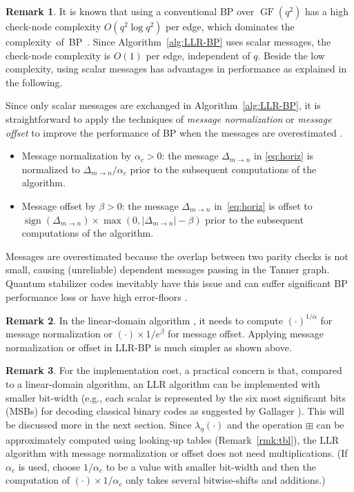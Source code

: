 \documentclass{ieeeaccess}
\DeclareMathOperator{\sign}{sign}
\DeclareMathOperator{\GF}{GF}
\let\emph\textit
\theoremstyle{definition}		%
\newtheorem{remark}{Remark}
\begin{document}
\begin{remark} \label{rmk:cmpx_c}
	It is known that using a conventional BP over $\GF(q^2)$ has a high check-node complexity $O(q^2\log q^2)$ per edge, which 
	dominates the \mbox{complexity of BP \cite{MD01,DF07,Bab+15}}. 
	Since Algorithm~\ref{alg:LLR-BP} uses scalar messages, the check-node complexity is $O(1)$ per edge, independent of $q$.
	Beside the low complexity, using scalar messages has advantages in performance as explained in the following.
\end{remark}


Since only scalar messages are exchanged in Algorithm~\ref{alg:LLR-BP}, it is straightforward to apply the techniques of \emph{message normalization} or \emph{message offset} to improve the performance of BP when the messages are overestimated \cite{CF02b,CDE+05,YHB04}. 
%
\begin{itemize}
	\item Message normalization by  $\alpha_c>0$: 
	the message $\Delta_{m\to n}$ in \eqref{eq:horiz} is normalized to $\Delta_{m\to n}/\alpha_c$ prior to  the subsequent computations of the algorithm.
	\item Message offset by   $\beta>0$: 
	the message $\Delta_{m\to n}$ in~\eqref{eq:horiz} is offset to $\sign(\Delta_{m\to n})\times \max(0,|\Delta_{m\to n}|-\beta)$  prior to  the subsequent computations of the algorithm.
\end{itemize}
%
%
Messages are overestimated  because  the overlap between two parity checks is not small, causing (unreliable) dependent messages passing in the Tanner graph.
Quantum stabilizer codes  inevitably have this issue and can suffer significant BP performance loss or have high error-floors \cite{MMM04,PC08,Wan+12,Bab+15,ROJ19,PK19,LP19,KL20,RWBC20}.

\begin{remark} \label{rmk:perf}
	In the linear-domain algorithm \cite{KL20},
	it needs to compute $(\cdot)^{1/\alpha}$ for message normalization or $(\cdot)\times 1/e^\beta$ for message offset. 
	Applying message normalization or offset in LLR-BP is much simpler as shown above.
\end{remark}



\begin{remark} \label{rmk:cmpx2}
	For the implementation cost,
	a practical concern   is that, compared to a linear-domain algorithm, 
	an LLR algorithm can be implemented with smaller bit-width  (e.g., each scalar is represented by the six most significant bits (MSBs) for decoding classical binary codes as suggested by Gallager \cite{Gal63}).
	This will be discussed more in the next section.
	Since $\lambda_\eta(\cdot)$ and the operation $\boxplus$ can be approximately computed using looking-up tables (Remark~\ref{rmk:tbl}),
	the LLR algorithm with message normalization or offset does not need multiplications.
	(If $\alpha_c$ is used, choose $1/\alpha_c$ to be a value with smaller bit-width and then the computation of $(\cdot)\times 1/\alpha_c$ only takes several bitwise-shifts and additions.)
\end{remark}
\end{document}
